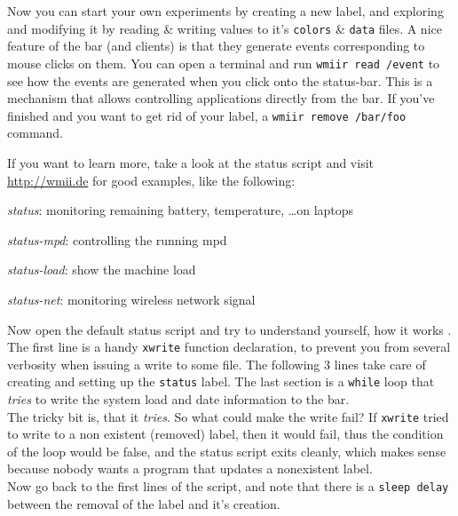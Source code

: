 \documentclass[12pt,a4paper]{article} %
\newcommand{\hrefx}[1]{\href{#1}{#1}} %
\newenvironment{itemize*}
  {\begin{itemize}
      \setlength{\itemsep}{0pt}
      \setlength{\parskip}{0pt}}
  {\end{itemize}}
\begin{document}
    Now you can start your own experiments by creating a new label, and
    exploring and modifying it by reading \& writing values to it's
    \verb+colors+ \& \verb+data+ files.  A nice feature of the bar
    (and clients) is that they generate events corresponding to mouse
    clicks on them.  You can open a terminal and run
    \verb+wmiir read /event+ to see how the events are generated
    when you click onto the status-bar. This is a mechanism that allows
    controlling applications directly from the bar. If you've
    finished and you want to get rid of your label,
    a \verb+wmiir remove /bar/foo+ command.
    
    If you want to learn more, take a look at the status script and 
    visit \hrefx{http://wmii.de} for good examples, like the following:

    \begin{itemize*}
    \item \emph{status}: monitoring remaining battery, temperature, \dots on laptops
    \item \emph{status-mpd}: controlling the running mpd
    \item \emph{status-load}: show the machine load
    \item \emph{status-net}: monitoring wireless network signal
    \end{itemize*}
    
    Now open the default status script and try to understand yourself,
    how it works . The first line is a handy
    \verb+xwrite+ function declaration, to prevent you from several verbosity
    when issuing a write to some file. The following 3 lines take care of
    creating and setting up the \verb+status+ label. The last section is a
    \verb+while+ loop
    that \emph{tries} to write the system load and date information
    to the bar.\\
    
    The tricky bit is, that it \emph{tries}. So what could make the write
    fail? If \verb+xwrite+ tried to write to a non existent (removed)
    label, then it would fail, thus the condition of the loop would be
    false, and the status script exits cleanly, which makes sense
    because nobody wants a program that updates a nonexistent label.\\

    Now go back to the first lines of the script, and note 
    that there is a \verb+sleep delay+ between the removal of the
    label and it's creation.
    
\end{document}
